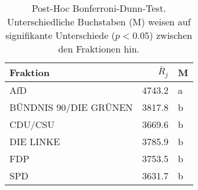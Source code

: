 \begin{table}[ht]
\centering
\begin{tabular}{lrl}
  \hline
Fraktion & $\bar{R}_{j}$ & M \\ 
  \hline
AfD & 4743.2 & a \\ 
  BÜNDNIS 90/DIE GRÜNEN & 3817.8 & b \\ 
  CDU/CSU & 3669.6 & b \\ 
  DIE LINKE & 3785.9 & b \\ 
  FDP & 3753.5 & b \\ 
  SPD & 3631.7 & b \\ 
   \hline
\end{tabular}
\caption[Post-Hoc Bonferroni-Dunn-Test]{Post-Hoc Bonferroni-Dunn-Test. Unterschiedliche Buchstaben (M) 
weisen auf signifikante Unterschiede ($p < 0.05$) zwischen den Fraktionen hin.} 
\label{table:dunn-test}
\end{table}
